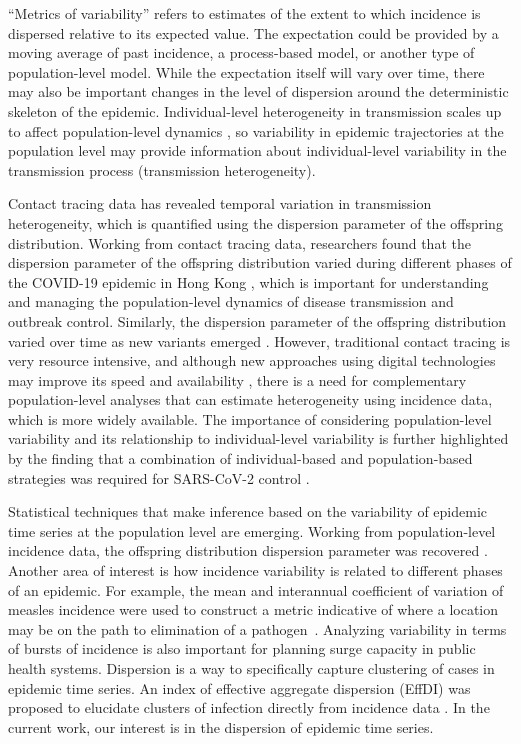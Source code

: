 \documentclass[10pt,letterpaper]{article}
\begin{document}
``Metrics of variability'' refers to estimates of the extent to which incidence is dispersed relative to its expected value.
The expectation could be provided by a moving average of past incidence, a process-based model, or another type of population-level model. 
While the expectation itself will vary over time, there may also be important changes in the level of dispersion around the deterministic skeleton of the epidemic. 
Individual-level heterogeneity in transmission scales up to affect population-level dynamics \cite{lloyd-smith_superspreading_2005}, so variability in epidemic trajectories at the population level may provide information about individual-level variability in the transmission process (transmission heterogeneity).

Contact tracing data has revealed temporal variation in transmission heterogeneity, which is quantified using the dispersion parameter of the offspring distribution.
Working from contact tracing data, researchers found that the dispersion parameter of the offspring distribution varied during different phases of the COVID-19 epidemic in Hong Kong \cite{guo2023statistical}, which is important for understanding and managing the population-level dynamics of disease transmission and outbreak control.
Similarly, the dispersion parameter of the offspring distribution varied over time as new variants emerged \cite{ko2023time}. 
However, traditional contact tracing is very resource intensive, and although new approaches using digital technologies may improve its speed and availability \cite{kretzschmar_impact_2020}, there is a need for complementary population-level analyses that can estimate heterogeneity using incidence data, which is more widely available. The importance of considering population-level variability and its relationship to individual-level variability is further highlighted by the finding that a combination of individual-based and population-based strategies was required for SARS-CoV-2 control \cite{sun_transmission_2021}. 

Statistical techniques that make inference based on the variability of epidemic time series at the population level are emerging. Working from population-level incidence data, the offspring distribution dispersion parameter was recovered \cite{kirkegaard_superspreading_2021}.
Another area of interest is how incidence variability is related to different phases of an epidemic. For example, the mean and interannual coefficient of variation of measles incidence were used to construct a metric indicative of where a location may be on the path to elimination of a pathogen~\cite{graham_measles_2019}. 
Analyzing variability in terms of bursts of incidence is also important for planning surge capacity in public health systems\cite{wallinga_metropolitan_2018}. 
Dispersion is a way to specifically capture clustering of cases in epidemic time series. An index of effective aggregate dispersion (EffDI) was proposed to elucidate clusters of infection directly from incidence data \cite{schneckenreither_assessing_2023}. In the current work, our interest is in the dispersion of epidemic time series.
\end{document}
